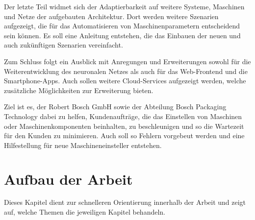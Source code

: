 Der letzte Teil widmet sich der Adaptierbarkeit auf weitere Systeme, Maschinen und Netze der aufgebauten Architektur.
Dort werden weitere Szenarien aufgezeigt, die für das Automatisieren von Maschinenparametern entscheidend sein können.
Es soll eine Anleitung entstehen, die das Einbauen der neuen und auch zukünftigen Szenarien vereinfacht.

Zum Schluss folgt ein Ausblick mit Anregungen und Erweiterungen sowohl für die Weiterentwicklung des neuronalen Netzes
als auch für das Web-Frontend und die Smartphone-Apps. Auch sollen weitere Cloud-Services aufgezeigt werden, welche
zusätzliche Möglichkeiten zur Erweiterung bieten.

Ziel ist es, der Robert Bosch GmbH sowie der Abteilung Bosch Packaging Technology dabei zu helfen, Kundenaufträge, die
das Einstellen von Maschinen oder Maschinenkomponenten beinhalten, zu beschleunigen und so die Wartezeit für den Kunden
zu minimieren. Auch soll so Fehlern vorgebeut werden und eine Hilfestellung für neue Maschineneinsteller entstehen.

\newpage

\section{Aufbau der Arbeit}
\label{sec:aufbauDerArbeit}
Dieses Kapitel dient zur schnelleren Orientierung innerhalb der Arbeit und zeigt auf, welche Themen die jeweiligen
Kapitel behandeln.

